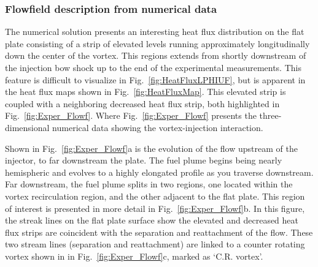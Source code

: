 \documentclass{AIAA}
\begin{document}
\subsubsection{Flowfield description from numerical data}

The numerical solution presents an interesting heat flux distribution on the flat plate consisting of a strip of elevated levels running approximately longitudinally down the center of the vortex.
This regions extends from shortly downstream of the injection bow shock up to the end of the experimental measurements.
This feature is difficult to visualize in Fig.~\ref{fig:HeatFluxLPHIUF}, but is apparent in the heat flux maps shown in Fig.~\ref{fig:HeatFluxMap}.
This elevated strip is coupled with a neighboring decreased heat flux strip, both highlighted in Fig.~\ref{fig:Exper_Flowf}.
Where Fig.~\ref{fig:Exper_Flowf} presents the three-dimensional numerical data showing the vortex-injection interaction. 


Shown in Fig.~\ref{fig:Exper_Flowf}a is the evolution of the flow upstream of the injector, to far downstream the plate.
The fuel plume begins being nearly hemispheric and evolves to a highly elongated profile as you traverse downstream. 
Far downstream, the fuel plume splits in two regions, one located within the vortex recirculation region, and the other adjacent to the flat plate.
This region of interest is presented in more detail in Fig.~\ref{fig:Exper_Flowf}b.
In this figure, the streak lines on the flat plate surface show the elevated and decreased heat flux strips are coincident with the separation and reattachment of the flow.
These two stream lines (separation and reattachment) are linked to a counter rotating vortex shown in in Fig.~\ref{fig:Exper_Flowf}c, marked as `C.R. vortex'.
\end{document}
